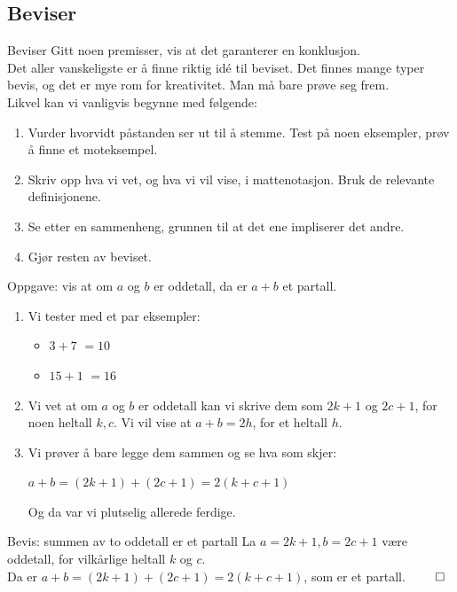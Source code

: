 \subsection*{Beviser}

\begin{frame}{Beviser}
    Gitt noen premisser, vis at det garanterer en konklusjon.\\

    Det aller vanskeligste er å finne riktig idé til beviset. Det finnes mange typer bevis, og det er mye rom for kreativitet. Man må bare prøve seg frem.\\
    
    \pause
    Likvel kan vi vanligvis begynne med følgende:
    \begin{enumerate}
        \item Vurder hvorvidt påstanden ser ut til å stemme. Test på noen eksempler, prøv å finne et moteksempel.
        \pause
        \item Skriv opp hva vi vet, og hva vi vil vise, i mattenotasjon. Bruk de relevante definisjonene.
        \pause
        \item Se etter en sammenheng, grunnen til at det ene impliserer det andre.
        \pause
        \item Gjør resten av beviset.
    \end{enumerate}
\end{frame}

\begin{frame}{Oppgave: vis at om $a$ og $b$ er oddetall, da er $a + b$ et partall.}
    \pause
    \begin{enumerate}
        \item Vi tester med et par eksempler: 
        \begin{itemize}
            \item $3+7$ \pause $= 10$ \checkmark
            \item $15+1$ \pause $ = 16$ \checkmark
        \end{itemize}
        \pause
        \item Vi vet at om $a$ og $b$ er oddetall kan vi skrive dem som $2k + 1$ og $2c + 1$, for noen heltall $k, c$. 
        \pause
        Vi vil vise at $a + b = 2h$, for et heltall $h$.
        \pause
        \item Vi prøver å bare legge dem sammen og se hva som skjer:
        
        $a + b = (2k + 1) + (2c + 1) = 2(k + c + 1)$

        Og da var vi plutselig allerede ferdige.
    \end{enumerate}

    \pause
    \begin{block}{Bevis: summen av to oddetall er et partall}
        La $a = 2k + 1, b = 2c + 1$ være oddetall, for vilkårlige heltall $k$ og $c$.\\\pause
        Da er $a + b = (2k + 1) + (2c + 1) = 2(k + c + 1)$, som er et partall. $\qed$
    \end{block}
\end{frame}


